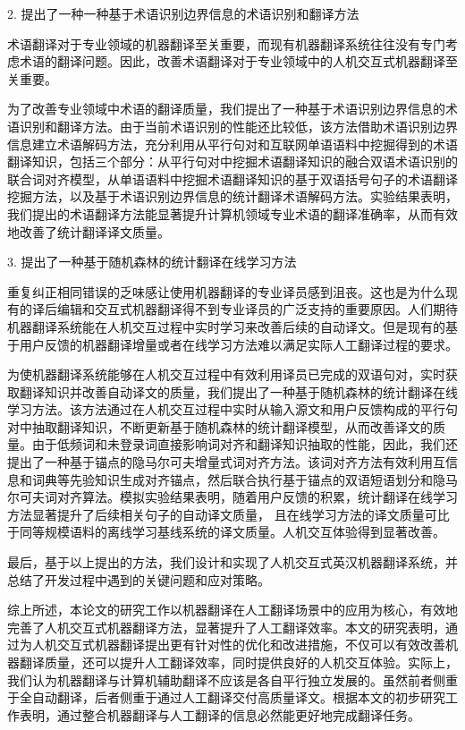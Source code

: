 2. 提出了一种一种基于术语识别边界信息的术语识别和翻译方法

术语翻译对于专业领域的机器翻译至关重要，而现有机器翻译系统往往没有专门考虑术语的翻译问题。因此，改善术语翻译对于专业领域中的人机交互式机器翻译至关重要。

为了改善专业领域中术语的翻译质量，我们提出了一种基于术语识别边界信息的术语识别和翻译方法。由于当前术语识别的性能还比较低，该方法借助术语识别边界信息建立术语解码方法，充分利用从平行句对和互联网单语语料中挖掘得到的术语翻译知识，包括三个部分：从平行句对中挖掘术语翻译知识的融合双语术语识别的联合词对齐模型，从单语语料中挖掘术语翻译知识的基于双语括号句子的术语翻译挖掘方法，以及基于术语识别边界信息的统计翻译术语解码方法。实验结果表明，我们提出的术语翻译方法能显著提升计算机领域专业术语的翻译准确率，从而有效地改善了统计翻译译文质量。

3. 提出了一种基于随机森林的统计翻译在线学习方法

重复纠正相同错误的乏味感让使用机器翻译的专业译员感到沮丧。这也是为什么现有的译后编辑和交互式机器翻译得不到专业译员的广泛支持的重要原因。人们期待机器翻译系统能在人机交互过程中实时学习来改善后续的自动译文。但是现有的基于用户反馈的机器翻译增量或者在线学习方法难以满足实际人工翻译过程的要求。

为使机器翻译系统能够在人机交互过程中有效利用译员已完成的双语句对，实时获取翻译知识并改善自动译文的质量，我们提出了一种基于随机森林的统计翻译在线学习方法。该方法通过在人机交互过程中实时从输入源文和用户反馈构成的平行句对中抽取翻译知识，不断更新基于随机森林的统计翻译模型，从而改善译文的质量。由于低频词和未登录词直接影响词对齐和翻译知识抽取的性能，因此，我们还提出了一种基于锚点的隐马尔可夫增量式词对齐方法。该词对齐方法有效利用互信息和词典等先验知识生成对齐锚点，然后联合执行基于锚点的双语短语划分和隐马尔可夫词对齐算法。模拟实验结果表明，随着用户反馈的积累，统计翻译在线学习方法显著提升了后续相关句子的自动译文质量， 且在线学习方法的译文质量可比于同等规模语料的离线学习基线系统的译文质量。人机交互体验得到显著改善。

最后，基于以上提出的方法，我们设计和实现了人机交互式英汉机器翻译系统，并总结了开发过程中遇到的关键问题和应对策略。

综上所述，本论文的研究工作以机器翻译在人工翻译场景中的应用为核心，有效地完善了人机交互式机器翻译方法，显著提升了人工翻译效率。本文的研究表明，通过为人机交互式机器翻译提出更有针对性的优化和改进措施，不仅可以有效改善机器翻译质量，还可以提升人工翻译效率，同时提供良好的人机交互体验。实际上，我们认为机器翻译与计算机辅助翻译不应该是各自平行独立发展的。虽然前者侧重于全自动翻译，后者侧重于通过人工翻译交付高质量译文。根据本文的初步研究工作表明，通过整合机器翻译与人工翻译的信息必然能更好地完成翻译任务。

